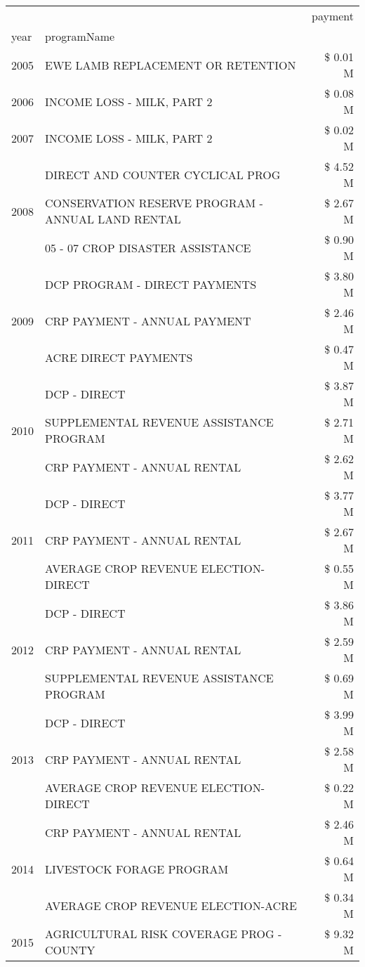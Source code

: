 \begin{tabular}{llr}
\toprule
 &  & payment \\
year & programName &  \\
\midrule
2005 & EWE LAMB REPLACEMENT OR RETENTION & \$ 0.01 M \\
\cline{1-3}
2006 & INCOME LOSS - MILK, PART 2 & \$ 0.08 M \\
\cline{1-3}
2007 & INCOME LOSS - MILK, PART 2 & \$ 0.02 M \\
\cline{1-3}
\multirow[t]{3}{*}{2008} & DIRECT AND COUNTER CYCLICAL PROG & \$ 4.52 M \\
 & CONSERVATION RESERVE PROGRAM - ANNUAL LAND RENTAL & \$ 2.67 M \\
 & 05 - 07 CROP DISASTER ASSISTANCE & \$ 0.90 M \\
\cline{1-3}
\multirow[t]{3}{*}{2009} & DCP PROGRAM - DIRECT PAYMENTS & \$ 3.80 M \\
 & CRP PAYMENT - ANNUAL PAYMENT & \$ 2.46 M \\
 & ACRE DIRECT PAYMENTS & \$ 0.47 M \\
\cline{1-3}
\multirow[t]{3}{*}{2010} & DCP - DIRECT & \$ 3.87 M \\
 & SUPPLEMENTAL REVENUE ASSISTANCE PROGRAM & \$ 2.71 M \\
 & CRP PAYMENT - ANNUAL RENTAL & \$ 2.62 M \\
\cline{1-3}
\multirow[t]{3}{*}{2011} & DCP - DIRECT & \$ 3.77 M \\
 & CRP PAYMENT - ANNUAL RENTAL & \$ 2.67 M \\
 & AVERAGE CROP REVENUE ELECTION-DIRECT & \$ 0.55 M \\
\cline{1-3}
\multirow[t]{3}{*}{2012} & DCP - DIRECT & \$ 3.86 M \\
 & CRP PAYMENT - ANNUAL RENTAL & \$ 2.59 M \\
 & SUPPLEMENTAL REVENUE ASSISTANCE PROGRAM & \$ 0.69 M \\
\cline{1-3}
\multirow[t]{3}{*}{2013} & DCP - DIRECT & \$ 3.99 M \\
 & CRP PAYMENT - ANNUAL RENTAL & \$ 2.58 M \\
 & AVERAGE CROP REVENUE ELECTION-DIRECT & \$ 0.22 M \\
\cline{1-3}
\multirow[t]{3}{*}{2014} & CRP PAYMENT - ANNUAL RENTAL & \$ 2.46 M \\
 & LIVESTOCK FORAGE PROGRAM & \$ 0.64 M \\
 & AVERAGE CROP REVENUE ELECTION-ACRE & \$ 0.34 M \\
\cline{1-3}
\multirow[t]{3}{*}{2015} & AGRICULTURAL RISK COVERAGE PROG - COUNTY & \$ 9.32 M \\

\end{tabular}
